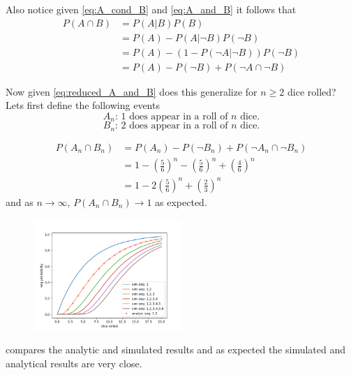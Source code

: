 \documentclass[12pt,a4paper]{article}
\begin{document}
Also notice given \cref{eq:A_cond_B} and \cref{eq:A_and_B} it follows that
\begin{align}
P(A \cap B)     &= P(A|B)P(B)\\
                &= P(A) - P(A|\neg B) P(\neg B)\\
                &= P(A) - (1 - P(\neg A|\neg B)) P(\neg B)\\
                &= P(A) - P(\neg B) + P(\neg A \cap \neg B)
\label{eq:reduced_A_and_B}
\end{align}

Now given \cref{eq:reduced_A_and_B} does this generalize for $n\geq 2$ dice rolled? Lets first define the following events
\begin{equation}
A_n \text{: 1 does appear in a roll of $n$ dice.}
\end{equation}
\begin{equation}
B_n \text{: 2 does appear in a roll of $n$ dice.}
\end{equation}

\begin{align*}
P(A_n \cap B_n) &= P(A_n) - P(\neg B_n) + P(\neg A_n \cap \neg B_n)\\
                &=  1-\left(\frac{5}{6}\right)^n -\left(\frac{5}{6}\right)^n + \left(\frac{4}{6}\right)^n\\
                &= 1 - 2\left(\frac{5}{6}\right)^n + \left(\frac{2}{3}\right)^n
\label{eq:A_and_B_sol}
\end{align*}
and as $n\to\infty$, $P(A_n \cap B_n) \to 1$ as expected.\\

\begin{figure}[h]
    \centering
    \includegraphics[width=0.5\textwidth]{figs/compare_analytic_sim.png}
    \caption{}
    \label{fig:compare_analytic_sim}
\end{figure}
 compares the analytic and simulated results and as expected the simulated and analytical results are very close.\\
\end{document}
